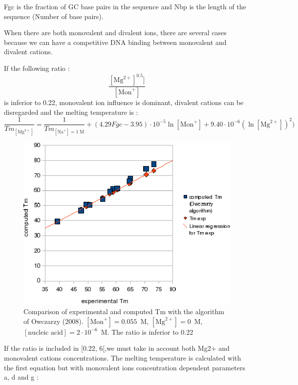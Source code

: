 \documentclass{article}
\begin{document}
Fgc is the fraction of GC base pairs in the sequence and 
Nbp is the length of the sequence (Number of base pairs).

When there are both monovalent and divalent ions, there are several cases because we can have
a competitive DNA binding between monovalent and divalent 
cations.

If the following ratio :
\begin{displaymath}
  \frac{[\mbox{Mg}^{2+}]^{0.5}]}{[\mbox{Mon}^+]}  
\end{displaymath}
is inferior to 0.22, monovalent ion influence is dominant, divalent cations can be 
disregarded and the melting temperature is :
\begin{displaymath}
\frac{1}{Tm_{[\mbox{Mg}^{2+}]}} = \frac{1}{Tm_{[\mbox{Na}^+]=1\;\mathrm{M}}} + (4.29
Fgc - 3.95)\cdot{}10^{-5} \ln [\mbox{Mon}^+] + 9.40\cdot{}10^{-6} (\ln [\mbox{Mg}^{2+}])^{2})
\end{displaymath}
  
\begin{figure}[H]
\includegraphics{Owczarzy2.eps}
\caption{Comparison of experimental and computed Tm with the algorithm of Owczarzy (2008). 
$[\mbox{Mon}^+] = 0.055$~M, $[\mbox{Mg}^{2+}] = 0$~M, $[\mbox{nucleic acid}] =
2\cdot{}10^{-6}$~M. The ratio is inferior to 0.22}
\end{figure}


If the ratio is included in [0.22, 6[,we must take in account both Mg2+ and monovalent cations 
concentrations. The melting temperature is calculated with the first equation but with monovalent 
ions concentration dependent parameters a, d and g :
\end{document}
